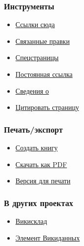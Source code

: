 \documentclass[a4paper,11pt]{article}
\begin{document}
\subsubsection{Инструменты}
\begin{itemize}
	\item \href{https://ru.wikipedia.org/wiki/%D0%A1%D0%BB%D1%83%D0%B6%D0%B5%D0%B1%D0%BD%D0%B0%D1%8F:%D0%A1%D1%81%D1%8B%D0%BB%D0%BA%D0%B8_%D1%81%D1%8E%D0%B4%D0%B0/Xeon}{Ссылки сюда}
	\item \href{https://ru.wikipedia.org/wiki/%D0%A1%D0%BB%D1%83%D0%B6%D0%B5%D0%B1%D0%BD%D0%B0%D1%8F:%D0%A1%D0%B2%D1%8F%D0%B7%D0%B0%D0%BD%D0%BD%D1%8B%D0%B5_%D0%BF%D1%80%D0%B0%D0%B2%D0%BA%D0%B8/Xeon}{Связанные правки}
	\item \href{https://ru.wikipedia.org/wiki/%D0%A1%D0%BB%D1%83%D0%B6%D0%B5%D0%B1%D0%BD%D0%B0%D1%8F:%D0%A1%D0%BF%D0%B5%D1%86%D1%81%D1%82%D1%80%D0%B0%D0%BD%D0%B8%D1%86%D1%8B}{Спецстраницы}
	\item \href{https://ru.wikipedia.org/w/index.php?title=Xeon&amp;oldid=94292032}{Постоянная ссылка}
	\item \href{https://ru.wikipedia.org/w/index.php?title=Xeon&amp;action=info}{Сведения о}
	\item \href{https://ru.wikipedia.org/w/index.php?title=%D0%A1%D0%BB%D1%83%D0%B6%D0%B5%D0%B1%D0%BD%D0%B0%D1%8F:%D0%A6%D0%B8%D1%82%D0%B0%D1%82%D0%B0&amp;page=Xeon&amp;id=94292032}{Цитировать страницу}
\end{itemize}

\subsubsection{Печать/экспорт}
\begin{itemize}
	\item \href{https://ru.wikipedia.org/w/index.php?title=%D0%A1%D0%BB%D1%83%D0%B6%D0%B5%D0%B1%D0%BD%D0%B0%D1%8F:%D0%9A%D0%BE%D0%BB%D0%BB%D0%B5%D0%BA%D1%86%D0%B8%D1%8F_%D0%BA%D0%BD%D0%B8%D0%B3&amp;bookcmd=book_creator&amp;referer=Xeon}{Создать книгу}
	\item \href{https://ru.wikipedia.org/w/index.php?title=%D0%A1%D0%BB%D1%83%D0%B6%D0%B5%D0%B1%D0%BD%D0%B0%D1%8F:ElectronPdf&amp;page=Xeon&amp;action=show-download-screen}{Скачать как PDF}
	\item \href{https://ru.wikipedia.org/w/index.php?title=Xeon&amp;printable=yes}{Версия для печати}
\end{itemize}

\subsubsection{В других проектах}
\begin{itemize}
	\item \href{https://commons.wikimedia.org/wiki/Category:Xeon}{Викисклад}
	\item \href{https://www.wikidata.org/wiki/Special:EntityPage/Q656154}{Элемент Викиданных}
\end{itemize}
\end{document}
